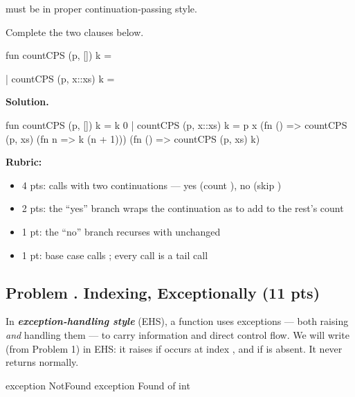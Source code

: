 \documentclass[crop=false]{standalone}
\newif\ifsol
\newenvironment{solution}
    {\par\color{solution_color}\begin{framed}\textbf{Solution.}\par}
    {\end{framed}}
\newcommand{\term}[1]{\textbf{\textit{#1}}}
\newcommand{\quizproblem}[3]{%
  \needspace{5\baselineskip}%
  \stepcounter{problem}%
  \ifsol
    \subsection*{Problem \arabic{problem}. #1 \hfill \timing{#2} \quad (#3 pts)}%
  \else
    \subsection*{Problem \arabic{problem}. #1 \hfill (#3 pts)}%
  \fi
}
\newcommand{\answerspace}[1]{\ifsol\else\vspace{#1}\par\fi}
\begin{document}
\begin{constraint}
   must be in proper continuation-passing style.
\end{constraint}

Complete the two clauses below.

\begin{codeblock}
  fun countCPS (p, []) k =

    | countCPS (p, x::xs) k =
\end{codeblock}

\answerspace{5cm}

\begin{solution}
\begin{codeblock}
  fun countCPS (p, []) k = k 0
    | countCPS (p, x::xs) k =
        p x
          (fn () => countCPS (p, xs) (fn n => k (n + 1)))
          (fn () => countCPS (p, xs) k)
\end{codeblock}

\textbf{Rubric:}
\begin{itemize}
  \item 4 pts: calls  with two continuations --- yes (count
    ), no (skip )
  \item 2 pts: the ``yes'' branch wraps the continuation as
     to add  to the rest's count
  \item 1 pt: the ``no'' branch recurses with  unchanged
  \item 1 pt: base case calls ; every call is a tail call
\end{itemize}
\end{solution}

\newpage


\quizproblem{Indexing, Exceptionally}{9}{11}

In \term{exception-handling style} (EHS), a function uses exceptions ---
both raising \emph{and} handling them --- to carry information and direct
control flow. We will write  (from Problem 1) in EHS: it
raises  if  occurs at index , and
 if  is absent. It never returns normally.

\begin{codeblock}
  exception NotFound
  exception Found of int
\end{codeblock}
\end{document}

